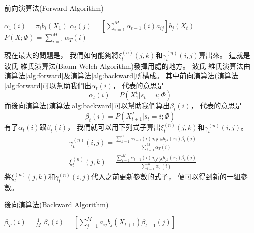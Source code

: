     \begin{algorithm}
      \caption{前向演算法(Forward Algorithm)}
      \label{alg:forward}
      \begin{algorithmic}[1]
	  \STATE $\alpha_1(i) = \pi_i b_i(X_1)$ 
	\ENDFOR
	    \STATE $\alpha_t(j) = \left[ \sum_{i=1}^M \alpha_{t-1}(i) a_{ij} \right] b_j(X_t)$ 
	  \ENDFOR
	\ENDFOR
	\STATE $P(X; \Phi) = \sum_{i=1}^M \alpha_T(i)$
      \end{algorithmic}
    \end{algorithm}
   
    現在最大的問題是，
    我們如何能夠將$\xi^{(n)}_t (j, k)$和$\gamma^{(n)}_t (i, j)$算出來。
    這就是波氏-維氏演算法(Baum-Welch Algorithm)發揮用處的地方。
    波氏-維氏演算法由演算法\ref{alg:forward}及演算法\ref{alg:backward}所構成。
    其中前向演算法(演算法\ref{alg:forward}可以幫助我們出$\alpha_t(i)$，
    代表的意思是
    \begin{equation}
      \alpha_t(i) = P(X_{1}^{t} | s_t = i; \Phi)
    \end{equation}
    而後向演算法(演算法\ref{alg:backward}可以幫助我們算出$\beta_t(i)$，
    代表的意思是
    \begin{equation}
      \beta_t(i) = P(X_{t+1}^T | s_t = i; \Phi)
    \end{equation}
    有了$\alpha_t(i)$跟$\beta_t(i)$， 
    我們就可以用下列式子算出$\xi^{(n)}_t (j, k)$和$\gamma^{(n)}_t (i, j)$。
    \begin{align}
      & \gamma^{(n)}_t (i, j) = \frac{ \sum_{k=1}^C \alpha_{t-1} (i) a_{ij} c_{jk} b_{jk} (x_t) \beta_t(j) }{ \sum_{i=1}^M \alpha_T(i) } \\ 
      & \xi^{(n)}_t (j, k) = \frac{ \sum_{i=1}^M \alpha_{t-1} (i) a_{ij} c_{jk} b_{jk} (x_t) \beta_t(j) }{ \sum_{i=1}^M \alpha_T(i) }  
    \end{align}
    將$\xi^{(n)}_t (j, k)$和$\gamma^{(n)}_t (i, j)$代入之前更新參數的式子，
    便可以得到新的一組參數。
    \begin{algorithm}
      \caption{後向演算法(Backward Algorithm)}
      \label{alg:backward}
      \begin{algorithmic}[1]
	\STATE $\beta_T(i) = \frac{1}{M}$ 
	    \STATE $\beta_t(i) = \left[ \sum_{j=1}^M a_{ij} b_j(X_{t+1}) \beta_{t+1}(j) \right]$
	  \ENDFOR
	\ENDFOR
      \end{algorithmic}
    \end{algorithm}

